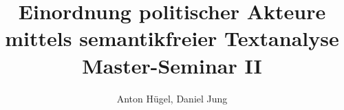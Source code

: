 \documentclass[oneside,12pt]{scrartcl}
\begin{document}
\begin{titlepage}
\author{Anton Hügel, Daniel Jung} 
\title{Einordnung politischer Akteure mittels semantikfreier Textanalyse \\ 
								{\normalsize Master-Seminar II}												} 
\maketitle

\end{titlepage}

\tableofcontents








\newpage

\end{document}
